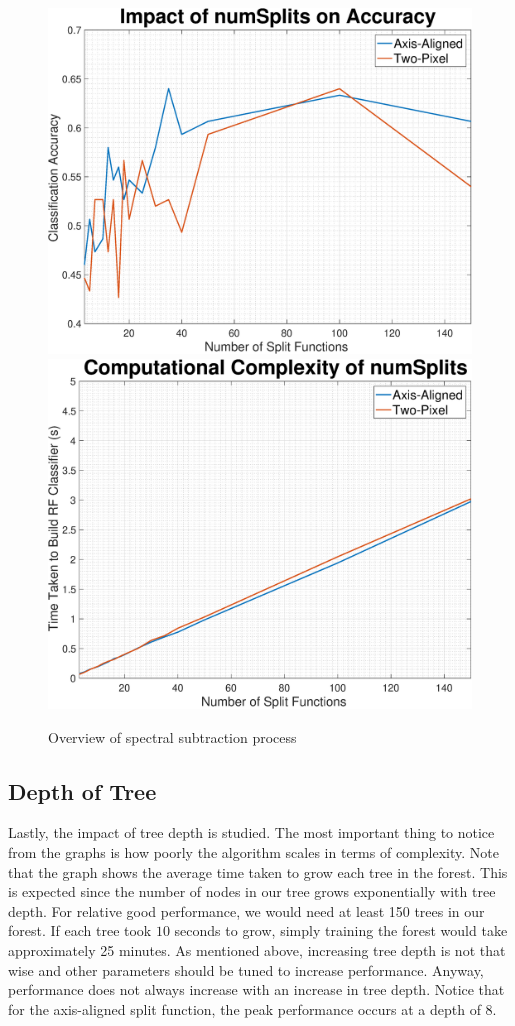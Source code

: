 \documentclass[a4paper,pra,twocolumn,10pt,aps,longbibliography,nobalancelastpage]{revtex4-1}
\begin{document}
\begin{figure}[H]
	\centering
    \includegraphics[width=0.49\columnwidth]{numSplits_acc}
	\includegraphics[width=0.49\columnwidth]{numSplits_complexity}
    \caption{Overview of spectral subtraction process}
\end{figure}

\subsection*{Depth of Tree}

Lastly, the impact of tree depth is studied. The most important thing to notice from the graphs is how poorly the algorithm scales in terms of complexity. Note that the graph shows the average time taken to grow each tree in the forest. This is expected since the number of nodes in our tree grows exponentially with tree depth. For relative good performance, we would need at least 150 trees in our forest. If each tree took $10$ seconds to grow, simply training the forest would take approximately 25 minutes. As mentioned above, increasing tree depth is not that wise and other parameters should be tuned to increase performance. Anyway, performance does not always increase with an increase in tree depth. Notice that for the axis-aligned split function, the peak performance occurs at a depth of 8. 
\end{document}
